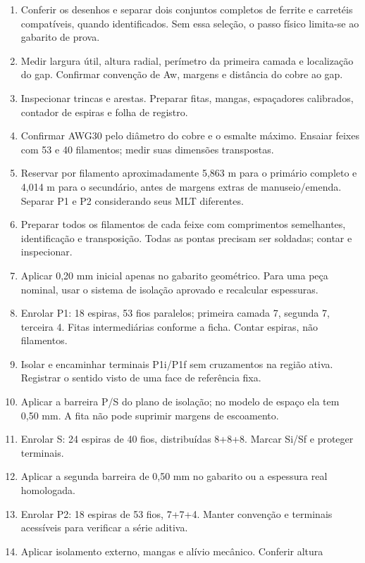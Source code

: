 \documentclass[
]{article}
\providecommand{\tightlist}{%
  \setlength{\itemsep}{0pt}\setlength{\parskip}{0pt}}
\begin{document}
\begin{enumerate}
\def\labelenumi{\arabic{enumi}.}
\tightlist
\item
  Conferir os desenhos e separar dois conjuntos completos de ferrite e
  carretéis compatíveis, quando identificados. Sem essa seleção, o passo
  físico limita-se ao gabarito de prova.
\item
  Medir largura útil, altura radial, perímetro da primeira camada e
  localização do gap. Confirmar convenção de Aw, margens e distância do
  cobre ao gap.
\item
  Inspecionar trincas e arestas. Preparar fitas, mangas, espaçadores
  calibrados, contador de espiras e folha de registro.
\item
  Confirmar AWG30 pelo diâmetro do cobre e o esmalte máximo. Ensaiar
  feixes com 53 e 40 filamentos; medir suas dimensões transpostas.
\item
  Reservar por filamento aproximadamente 5,863 m para o primário
  completo e 4,014 m para o secundário, antes de margens extras de
  manuseio/emenda. Separar P1 e P2 considerando seus MLT diferentes.
\item
  Preparar todos os filamentos de cada feixe com comprimentos
  semelhantes, identificação e transposição. Todas as pontas precisam
  ser soldadas; contar e inspecionar.
\item
  Aplicar 0,20 mm inicial apenas no gabarito geométrico. Para uma peça
  nominal, usar o sistema de isolação aprovado e recalcular espessuras.
\item
  Enrolar P1: 18 espiras, 53 fios paralelos; primeira camada 7, segunda
  7, terceira 4. Fitas intermediárias conforme a ficha. Contar espiras,
  não filamentos.
\item
  Isolar e encaminhar terminais P1i/P1f sem cruzamentos na região ativa.
  Registrar o sentido visto de uma face de referência fixa.
\item
  Aplicar a barreira P/S do plano de isolação; no modelo de espaço ela
  tem 0,50 mm. A fita não pode suprimir margens de escoamento.
\item
  Enrolar S: 24 espiras de 40 fios, distribuídas 8+8+8. Marcar Si/Sf e
  proteger terminais.
\item
  Aplicar a segunda barreira de 0,50 mm no gabarito ou a espessura real
  homologada.
\item
  Enrolar P2: 18 espiras de 53 fios, 7+7+4. Manter convenção e terminais
  acessíveis para verificar a série aditiva.
\item
  Aplicar isolamento externo, mangas e alívio mecânico. Conferir altura

\end{enumerate}
\end{document}
